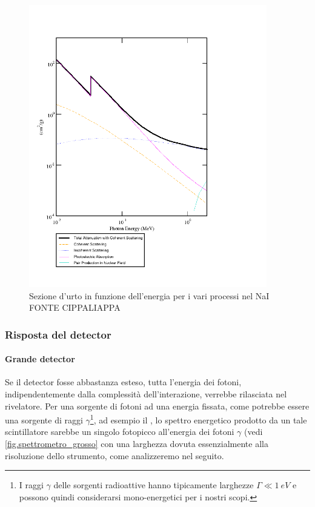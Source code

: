   \begin{figure}[h]
 	\centering
 	\includegraphics[width=28em]{photon_cross_section_xcom}
 	\caption{\label{fig:photon_cross_section_xcom}Sezione d'urto in funzione dell'energia per i vari processi nel NaI FONTE CIPPALIAPPA}
 \end{figure}
 
 \subsubsection{Risposta del detector}
 \paragraph{Grande detector} Se il detector fosse abbastanza esteso, tutta l'energia dei fotoni, indipendentemente dalla complessità dell'interazione, verrebbe rilasciata nel rivelatore. Per una sorgente di fotoni ad una energia fissata, come potrebbe essere una sorgente di raggi $\gamma$\footnote{I raggi $\gamma$ delle sorgenti radioattive hanno tipicamente larghezze $\Gamma \ll \SI{1}{eV}$ e possono quindi considerarsi mono-energetici per i nostri scopi.},
 ad esempio il \cs, lo spettro energetico prodotto da un tale scintillatore sarebbe un singolo fotopicco all'energia dei fotoni $\gamma$ (vedi \autoref{fig.spettrometro_grosso} con una larghezza dovuta essenzialmente alla risoluzione dello strumento, come analizzeremo nel seguito.
 
